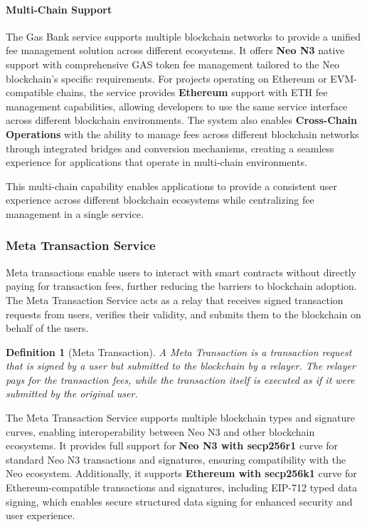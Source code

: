 \documentclass[12pt,a4paper]{article}
\newtheorem{definition}{Definition}
\begin{document}
\paragraph{Multi-Chain Support}
The Gas Bank service supports multiple blockchain networks to provide a unified fee management solution across different ecosystems. It offers \textbf{Neo N3} native support with comprehensive GAS token fee management tailored to the Neo blockchain's specific requirements. For projects operating on Ethereum or EVM-compatible chains, the service provides \textbf{Ethereum} support with ETH fee management capabilities, allowing developers to use the same service interface across different blockchain environments. The system also enables \textbf{Cross-Chain Operations} with the ability to manage fees across different blockchain networks through integrated bridges and conversion mechanisms, creating a seamless experience for applications that operate in multi-chain environments.

This multi-chain capability enables applications to provide a consistent user experience across different blockchain ecosystems while centralizing fee management in a single service.

\subsubsection{Meta Transaction Service}
\label{subsubsec:meta-tx}

Meta transactions enable users to interact with smart contracts without directly paying for transaction fees, further reducing the barriers to blockchain adoption. The Meta Transaction Service acts as a relay that receives signed transaction requests from users, verifies their validity, and submits them to the blockchain on behalf of the users.



\begin{definition}[Meta Transaction]
A Meta Transaction is a transaction request that is signed by a user but submitted to the blockchain by a relayer. The relayer pays for the transaction fees, while the transaction itself is executed as if it were submitted by the original user.
\end{definition}

The Meta Transaction Service supports multiple blockchain types and signature curves, enabling interoperability between Neo N3 and other blockchain ecosystems. It provides full support for \textbf{Neo N3 with secp256r1} curve for standard Neo N3 transactions and signatures, ensuring compatibility with the Neo ecosystem. Additionally, it supports \textbf{Ethereum with secp256k1} curve for Ethereum-compatible transactions and signatures, including EIP-712 typed data signing, which enables secure structured data signing for enhanced security and user experience.
\end{document}
